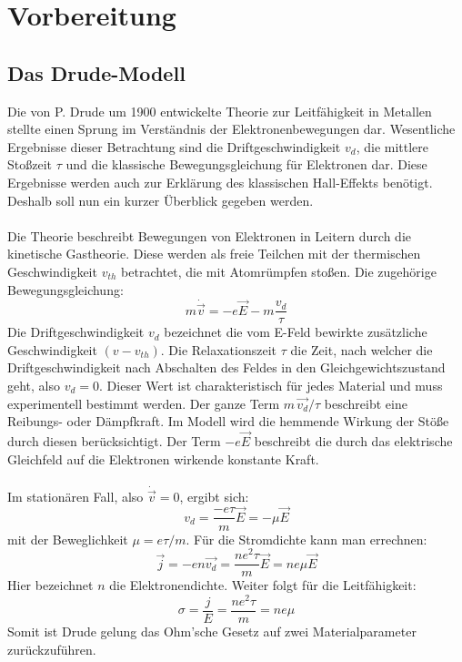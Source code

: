 \chapter{Vorbereitung}

\section{Das Drude-Modell}

Die von P. Drude um 1900 entwickelte Theorie zur Leitfähigkeit in Metallen stellte
einen Sprung im Verständnis der Elektronenbewegungen dar. Wesentliche Ergebnisse
dieser Betrachtung sind die Driftgeschwindigkeit $v_{d}$, die mittlere Stoßzeit
$\tau$ und die klassische Bewegungsgleichung für Elektronen dar. Diese Ergebnisse
werden auch zur Erklärung des klassischen Hall-Effekts benötigt. Deshalb soll nun
ein kurzer Überblick gegeben werden.\\\\
Die Theorie beschreibt Bewegungen von Elektronen in Leitern durch die kinetische
Gastheorie. Diese werden als freie Teilchen mit der thermischen Geschwindigkeit
$v_{th}$ betrachtet, die mit Atomrümpfen stoßen. Die zugehörige Bewegungsgleichung:
\[
    m \dot{\vec{v}} = - e \vec{E} - m \frac{v_{d}}{\tau}
\]
Die Driftgeschwindigkeit $v_{d}$ bezeichnet die vom E-Feld bewirkte zusätzliche 
Geschwindigkeit $(v-v_{th})$. Die Relaxationszeit $\tau$ die Zeit, nach welcher die
Driftgeschwindigkeit nach Abschalten des Feldes in den Gleichgewichtszustand geht,
also $v_{d} = 0$. Dieser Wert ist charakteristisch für jedes Material und muss
experimentell bestimmt werden. Der ganze Term $ m \, \vec{v_{d}} / \tau$ beschreibt
eine Reibungs- oder Dämpfkraft. Im Modell wird die hemmende Wirkung der Stöße durch
diesen berücksichtigt. Der Term $-e \vec{E}$ beschreibt die durch das elektrische 
Gleichfeld auf die Elektronen wirkende konstante Kraft.\\\\
Im stationären Fall, also $\dot{\vec{v}} = 0$, ergibt sich:
\[
    v_{d} = \frac{-e \tau}{m} \vec{E} = - \mu \vec{E}
\]
mit der Beweglichkeit $\mu = e \tau / m$. Für die Stromdichte kann man errechnen:
\[
    \vec{j} = -en\vec{v_{d}} = \frac{ne^{2}\tau}{m} \vec{E} = ne \mu \vec{E}
\]
Hier bezeichnet $n$ die Elektronendichte. Weiter folgt für die Leitfähigkeit:
\[
    \sigma = \frac{j}{E} = \frac{ne^{2}\tau}{m} = ne \mu
\]
Somit ist Drude gelung das Ohm'sche Gesetz auf zwei Materialparameter
zurückzuführen.\\\\

